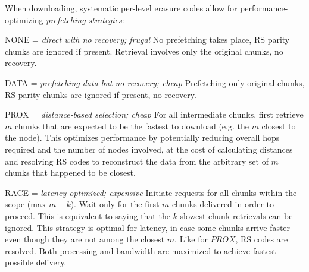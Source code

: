 \documentclass[manuscript,screen,review]{acmart}
\begin{document}
When downloading, systematic per-level erasure codes allow for performance-optimizing \emph{prefetching strategies}:
\begin{labelledlist}
\item[\textsc{NONE} = \emph{direct with no recovery; frugal}] No prefetching takes place, RS parity chunks are ignored if present. Retrieval involves  only the original chunks, no recovery. 
\item[\textsc{DATA} = \emph{prefetching data but no recovery; cheap}] Prefetching only original chunks, RS parity chunks are ignored if present, no recovery.
\item[\textsc{PROX} = \emph{distance-based selection; cheap}] For all intermediate chunks, first retrieve $ m$ chunks that are expected to be the fastest to download (e.g. the $m$ closest to the node). This optimizes performance by potentially reducing overall hops required and the number of nodes involved, at the cost of calculating distances and resolving RS codes to reconstruct the data from the arbitrary set of $m$ chunks that happened to be closest.
\item[\textsc{RACE} = \emph{latency optimized; expensive}] Initiate requests for all chunks within the scope (max $m+k$). Wait only for the first $m$ chunks delivered in order to proceed. This is equivalent to saying that the $k$ slowest chunk retrievals can be ignored. This strategy is optimal for latency, in case some chunks arrive faster even though they are not among the closest $m$. Like for $PROX$, RS codes are resolved. Both processing and bandwidth are maximized to achieve fastest possible delivery.
\end{labelledlist}

%
%
%
%
%
%
\end{document}
